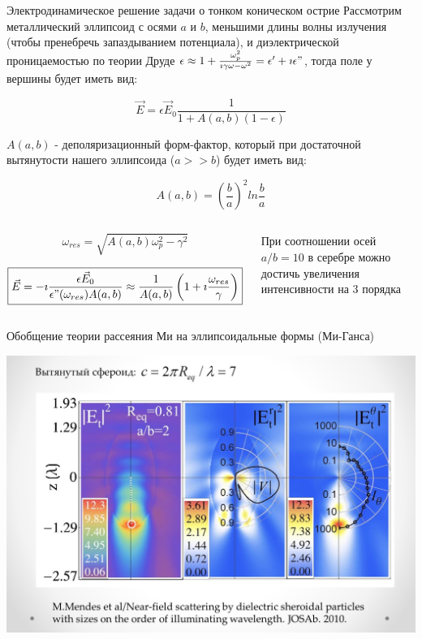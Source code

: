 \documentclass[9pt, compress, xcolor=table]{beamer}
\begin{document}
\begin{frame}{Электродинамическое решение задачи о тонком коническом острие}
Рассмотрим металлический эллипсоид с осями $a$ и $b$, меньшими длины волны излучения (чтобы пренебречь запаздыванием потенциала), и диэлектрической проницаемостью по теории Друде $\epsilon \approx 1+\frac{\omega_p^2}{\imath\gamma\omega -\omega^2}=\epsilon'+\imath \epsilon"$, тогда поле у вершины будет иметь вид:

\begin{equation*}
\vec E = \epsilon \vec E_0\frac{1}{1+A(a,b)(1-\epsilon)}
\end{equation*}

$A(a,b)$ - деполяризационный форм-фактор, который при достаточной вытянутости нашего эллипсоида ($a>>b$) будет иметь вид:

\begin{equation*}
A(a,b) = \left(\frac{b}{a}\right)^2 ln \frac{b}{a}
\end{equation*}

\begin{columns}
\column{8cm}
\begin{centering}
\begin{equation*}\boxed{
\omega_{res}=\sqrt{A(a,b)\omega_p^2-\gamma^2}}
\end{equation*}

\begin{equation*}
\boxed{\vec E = -\imath \frac{\epsilon \vec E_0}{\epsilon"(\omega_{res}) A(a,b)} \approx\frac{1}{A(a,b)}\left(1+\imath\frac{\omega_{res}}{\gamma}\right)}
\end{equation*}
\end{centering}
\column{4cm}
При соотношении осей $a/b=10$ в серебре можно достичь увеличения интенсивности на 3 порядка
\end{columns}
\end{frame}

\begin{frame}{Обобщение теории рассеяния Ми на эллипсоидальные формы (Ми-Ганса)}

\begin{center}
\includegraphics[width=\textwidth]{add_sl1}
\end{center}
\end{frame}
\end{document}
